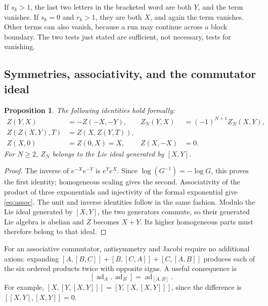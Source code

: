 \documentclass[11pt]{article}
\newtheorem{proposition}[theorem]{Proposition}
\theoremstyle{definition}
\theoremstyle{remark}
\newcommand{\ad}{\operatorname{ad}}
\numberwithin{equation}{section}
\begin{document}
If $s_k>1$, the last two letters in the bracketed word are both $Y$, and the term vanishes. If $s_k=0$ and $r_k>1$, they are both $X$, and again the term vanishes. Other terms can also vanish, because a run may continue across a block boundary. The two tests just stated are sufficient, not necessary, tests for vanishing.

\subsection{Symmetries, associativity, and the commutator ideal}
\begin{proposition}\label{prop:identities}
The following identities hold formally:
\begin{align}
 Z(Y,X)&=-Z(-X,-Y), &
 Z_N(Y,X)&=(-1)^{N+1}Z_N(X,Y),\label{eq:parity}\\
 Z(Z(X,Y),T)&=Z(X,Z(Y,T)),\label{eq:assoc}\\
 Z(X,0)&=Z(0,X)=X, & Z(X,-X)&=0.\label{eq:unitinverse}
\end{align}
For $N\geq2$, $Z_N$ belongs to the Lie ideal generated by $[X,Y]$.
\end{proposition}
\begin{proof}
The inverse of $e^{-X}e^{-Y}$ is $e^Ye^X$. Since $\log(G^{-1})=-\log G$, this proves the first identity; homogeneous scaling gives the second. Associativity of the product of three exponentials and injectivity of the formal exponential give \eqref{eq:assoc}. The unit and inverse identities follow in the same fashion. Modulo the Lie ideal generated by $[X,Y]$, the two generators commute, so their generated Lie algebra is abelian and $Z$ becomes $X+Y$. Its higher homogeneous parts must therefore belong to that ideal.
\end{proof}
For an associative commutator, antisymmetry and Jacobi require no additional axiom: expanding
$[A,[B,C]]+[B,[C,A]]+[C,[A,B]]$ produces each of the six ordered products twice with opposite signs. A useful consequence is
\begin{equation}\label{eq:ad-hom}
 [\ad_A,\ad_B]=\ad_{[A,B]}.
\end{equation}
For example, $[X,[Y,[X,Y]]]=[Y,[X,[X,Y]]]$, since the difference is $[[X,Y],[X,Y]]=0$.
\end{document}
